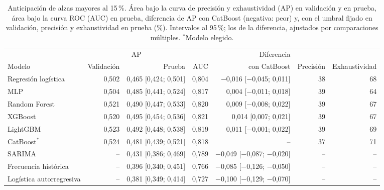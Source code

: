 \begin{table}[htbp]\centering\small
\caption{Anticipación de alzas mayores al 15\,\%. Área bajo la curva de precisión y exhaustividad (AP) en validación y en prueba, área bajo la curva ROC (AUC) en prueba, diferencia de AP con CatBoost (negativa: peor) y, con el umbral fijado en validación, precisión y exhaustividad en prueba (\%). Intervalos al 95\,\%; los de la diferencia, ajustados por comparaciones múltiples. $^\ast$Modelo elegido.}\label{tab:clf}
\begin{adjustbox}{max width=\textwidth}\begin{tabular}{lrrrrrr}\toprule
& \multicolumn{2}{c}{AP} & & Diferencia & & \\ \cmidrule(lr){2-3}
Modelo & Validación & Prueba & AUC & con CatBoost & Precisión & Exhaustividad\\ \midrule
Regresión logística & 0{,}502 & 0{,}465 [0{,}424; 0{,}501] & 0{,}804 & \ensuremath{-}0{,}016 [\ensuremath{-}0{,}045; 0{,}011] & 38 & 68 \\
MLP & 0{,}504 & 0{,}485 [0{,}441; 0{,}524] & 0{,}817 & 0{,}004 [\ensuremath{-}0{,}011; 0{,}018] & 39 & 64 \\
Random Forest & 0{,}521 & 0{,}490 [0{,}447; 0{,}533] & 0{,}820 & 0{,}009 [\ensuremath{-}0{,}008; 0{,}022] & 39 & 67 \\
XGBoost & 0{,}520 & 0{,}495 [0{,}454; 0{,}536] & 0{,}821 & 0{,}014 [0{,}007; 0{,}021] & 39 & 67 \\
LightGBM & 0{,}523 & 0{,}492 [0{,}448; 0{,}538] & 0{,}819 & 0{,}011 [\ensuremath{-}0{,}001; 0{,}022] & 39 & 69 \\
CatBoost$^\ast$ & 0{,}524 & 0{,}481 [0{,}439; 0{,}521] & 0{,}818 & -- & 37 & 71 \\
\midrule
SARIMA & -- & 0{,}431 [0{,}386; 0{,}469] & 0{,}789 & \ensuremath{-}0{,}049 [\ensuremath{-}0{,}087; \ensuremath{-}0{,}020] & -- & -- \\
Frecuencia histórica & -- & 0{,}396 [0{,}340; 0{,}451] & 0{,}766 & \ensuremath{-}0{,}085 [\ensuremath{-}0{,}126; \ensuremath{-}0{,}050] & -- & -- \\
Logística autorregresiva & -- & 0{,}381 [0{,}349; 0{,}414] & 0{,}727 & \ensuremath{-}0{,}100 [\ensuremath{-}0{,}129; \ensuremath{-}0{,}070] & -- & -- \\
\bottomrule\end{tabular}\end{adjustbox}\end{table}
